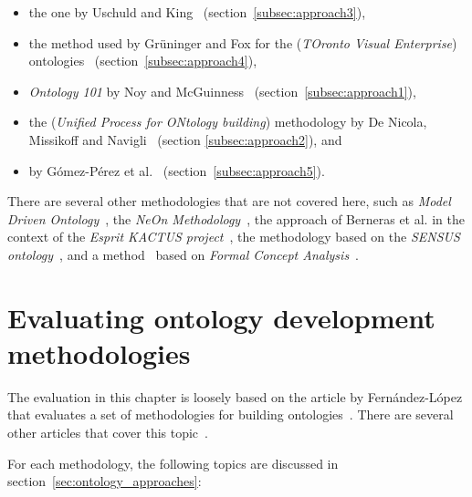 \begin{itemize}
  \item the one by Uschuld and King~\cite{UscholdKing} (section~\ref{subsec:approach3}),
  
  \item the method used by Grüninger and Fox for the  (\emph{TOronto Visual Enterprise}) ontologies~\cite{GruningerFox} (section~\ref{subsec:approach4}),
  
  \item \emph{Ontology 101} by Noy and McGuinness~\cite{Ontology101} (section~\ref{subsec:approach1}),

  \item the  (\emph{Unified Process for ONtology building}) methodology by De Nicola, Missikoff and Navigli~\cite{SoftwareEngineeringOntology} (section \ref{subsec:approach2}), and
  
  \item \methontology by Gómez-Pérez et al.~\cite{Methontology} (section~\ref{subsec:approach5}).
\end{itemize}

There are several other methodologies that are not covered here, such as \emph{Model Driven Ontology}~\cite{ModelDrivenOntology}, the \emph{NeOn Methodology}~\cite{NeOnMethodology}, the approach of Berneras et al. in the context of the \emph{Esprit KACTUS project}~\cite{KACTUSMethodology}, the methodology based on the \emph{SENSUS ontology}~\cite{SENSUSMethodology}, and a method~\cite{FCAMethod} based on \emph{Formal Concept Analysis}~\cite{FormalConceptAnalysis}.

\section{Evaluating ontology development methodologies}

The evaluation in this chapter is loosely based on the article by Fernández-López that evaluates a set of methodologies for building ontologies~\cite{MethodologyOverview}. There are several other articles that cover this topic~\cite{MethodologyComparison1,MethodologyComparison2,MethodologyComparison3}.

For each methodology, the following topics are discussed in section~\ref{sec:ontology_approaches}:

